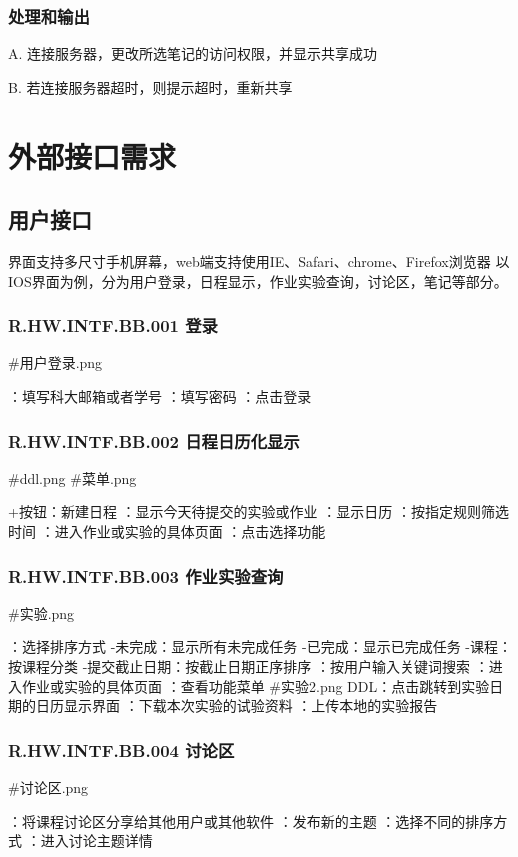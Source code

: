     \subsubsection{处理和输出}
	A. 连接服务器，更改所选笔记的访问权限，并显示共享成功

	B. 若连接服务器超时，则提示超时，重新共享

\section{外部接口需求}
  \subsection{用户接口}
  界面支持多尺寸手机屏幕，web端支持使用IE、Safari、chrome、Firefox浏览器
以IOS界面为例，分为用户登录，日程显示，作业实验查询，讨论区，笔记等部分。
    \subsubsection{R.HW.INTF.BB.001 登录}
    #用户登录.png
    \begin{itemize}
  ：填写科大邮箱或者学号
  ：填写密码
  ：点击登录
  \end{itemize}
    \subsubsection{R.HW.INTF.BB.002 日程日历化显示}
    #ddl.png
    #菜单.png
    \begin{itemize}
  \iterm+按钮：新建日程
  ：显示今天待提交的实验或作业
  ：显示日历
  ：按指定规则筛选时间
  ：进入作业或实验的具体页面
  ：点击选择功能
  \end{itemize}
    \subsubsection{R.HW.INTF.BB.003 作业实验查询}
    #实验.png
    \begin{itemize}
  ：选择排序方式
  \iterm-未完成：显示所有未完成任务
  \iterm-已完成：显示已完成任务
  \iterm-课程：按课程分类
  \iterm-提交截止日期：按截止日期正序排序
  ：按用户输入关键词搜索
  ：进入作业或实验的具体页面
  ：查看功能菜单
  #实验2.png
  \iterm DDL：点击跳转到实验日期的日历显示界面
  ：下载本次实验的试验资料
  ：上传本地的实验报告
    \subsubsection{R.HW.INTF.BB.004 讨论区}
    \end{itemize}
    #讨论区.png
    \begin{itemize}
  ：将课程讨论区分享给其他用户或其他软件
  ：发布新的主题
  ：选择不同的排序方式
  ：进入讨论主题详情
  \end{itemize}
